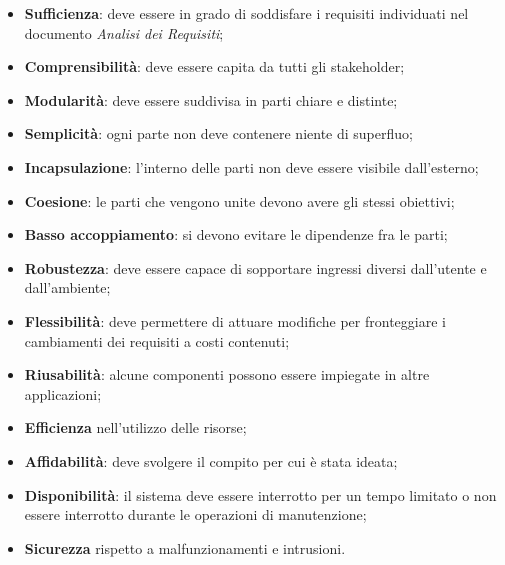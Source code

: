 			\begin{itemize}
				\item \textbf{Sufficienza}: deve essere in grado di soddisfare i requisiti individuati nel documento \textit{Analisi dei Requisiti};
				\item \textbf{Comprensibilità}: deve essere capita da tutti gli stakeholder\glo;
				\item \textbf{Modularità}: deve essere suddivisa in parti chiare e distinte;
				\item \textbf{Semplicità}: ogni parte non deve contenere niente di superfluo;
				\item \textbf{Incapsulazione}: l'interno delle parti non deve essere visibile dall'esterno;
				\item \textbf{Coesione}: le parti che vengono unite devono avere gli stessi obiettivi;
				\item \textbf{Basso accoppiamento}: si devono evitare le dipendenze fra le parti;
				\item \textbf{Robustezza}: deve essere capace di sopportare ingressi diversi dall'utente e dall'ambiente;
				\item \textbf{Flessibilità}: deve permettere di attuare modifiche per fronteggiare i cambiamenti dei requisiti a costi contenuti; 
				\item \textbf{Riusabilità}: alcune componenti possono essere impiegate in altre applicazioni;
				\item \textbf{Efficienza} nell'utilizzo delle risorse;
				\item \textbf{Affidabilità}: deve svolgere il compito per cui è stata ideata;
				\item \textbf{Disponibilità}: il sistema deve essere interrotto per un tempo limitato o non essere interrotto durante le operazioni di manutenzione;
				\item \textbf{Sicurezza} rispetto a malfunzionamenti e intrusioni.	
			\end{itemize}
